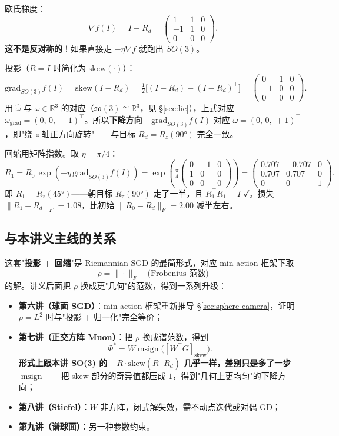 \documentclass[11pt,a4paper]{article}
\theoremstyle{mythm}
\theoremstyle{mydef}
\newcommand{\R}{\mathbb{R}}
\newcommand{\msign}{\operatorname{msign}}
\begin{document}
欧氏梯度：
$$\nabla f(I) = I - R_d = \begin{pmatrix}1 & 1 & 0\\ -1 & 1 & 0\\ 0 & 0 & 0\end{pmatrix}.$$
\textbf{这不是反对称的}！如果直接走 $-\eta\nabla f$ 就跑出 $SO(3)$。

投影（$R = I$ 时简化为 $\mathrm{skew}(\cdot)$）：
$$\mathrm{grad}_{SO(3)} f(I) = \mathrm{skew}(I - R_d) = \tfrac{1}{2}\big[(I-R_d) - (I-R_d)^\top\big] = \begin{pmatrix}0 & 1 & 0\\ -1 & 0 & 0\\ 0 & 0 & 0\end{pmatrix}.$$
用 $\hat{\omega}$ 与 $\omega \in \R^3$ 的对应（$\mathfrak{so}(3) \cong \R^3$，见 §\ref{sec:lie}），上式对应 $\omega_{\mathrm{grad}} = (0,\,0,\,-1)^\top$。所以\textbf{下降方向} $-\mathrm{grad}_{SO(3)} f(I)$ 对应 $\omega = (0,\,0,\,+1)^\top$，即"绕 $z$ 轴正方向旋转"——与目标 $R_d = R_z(90°)$ 完全一致。

回缩用矩阵指数。取 $\eta = \pi/4$：
$$R_1 = R_0\,\exp\!\left(-\eta\,\mathrm{grad}_{SO(3)} f(I)\right) = \exp\!\left(\tfrac{\pi}{4}\!\begin{pmatrix}0 & -1 & 0\\ 1 & 0 & 0\\ 0 & 0 & 0\end{pmatrix}\right) = \begin{pmatrix}0.707 & -0.707 & 0\\ 0.707 & 0.707 & 0\\ 0 & 0 & 1\end{pmatrix}.$$
即 $R_1 = R_z(45°)$——朝目标 $R_z(90°)$ 走了一半，且 $R_1^\top R_1 = I$ ✓。损失 $\|R_1 - R_d\|_F = 1.08$，比初始 $\|R_0 - R_d\|_F = 2.00$ 减半左右。

\subsection{与本讲义主线的关系}

这套"\textbf{投影 + 回缩}"是 Riemannian SGD 的最简形式，对应 min-action 框架下取
$$\rho = \|\cdot\|_F\quad\text{(Frobenius 范数)}$$
的解。讲义后面把 $\rho$ 换成更"几何"的范数，得到一系列升级：
\begin{itemize}[leftmargin=2em]
\item \textbf{第六讲（球面 SGD）}：min-action 框架重新推导 §\ref{sec:sphere-camera}，证明 $\rho=L^2$ 时与"投影 + 归一化"完全等价；
\item \textbf{第七讲（正交方阵 Muon）}：把 $\rho$ 换成谱范数，得到
$$\Phi^* = W\msign\!\big([W^\top G]_{\mathrm{skew}}\big).$$
\textbf{形式上跟本讲 SO(3) 的 $-R\cdot\mathrm{skew}(R^\top R_d)$ 几乎一样，差别只是多了一步 $\msign$}——把 skew 部分的奇异值都压成 $1$，得到"几何上更均匀"的下降方向；
\item \textbf{第八讲（Stiefel）}：$W$ 非方阵，闭式解失效，需不动点迭代或对偶 GD；
\item \textbf{第九讲（谱球面）}：另一种参数约束。
\end{itemize}
\end{document}
